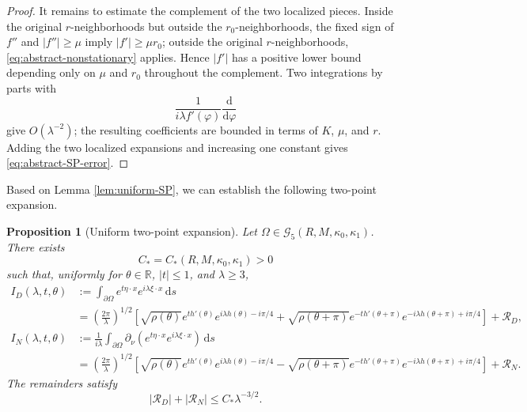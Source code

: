 \documentclass[12pt]{article}
\newcommand{\R}{\mathbb{R}}
\numberwithin{equation}{section}
\newtheorem{proposition}[theorem]{Proposition}
\numberwithin{equation}{section}
\newcommand{\pd}{\partial}
\newcommand{\dd}{\,\mathrm{d}}
\newcommand{\cG}{\mathcal{G}}
\newcommand{\cR}{\mathcal{R}}
\begin{document}
\begin{proof}
It remains to estimate the complement of the two localized pieces. Inside
the original $r$-neighborhoods but outside the $r_0$-neighborhoods, the fixed
sign of $f''$ and $\left|f''\right|\ge\mu$ imply $\left|f'\right|\ge\mu r_0$; outside the original
$r$-neighborhoods, \eqref{eq:abstract-nonstationary} applies. Hence $\left|f'\right|$
has a positive lower bound depending only on $\mu$ and $r_0$ throughout the
complement. Two integrations by parts with
\[
 \frac{1}{i\lambda f'(\varphi)}\frac{\mathrm{d}}{\mathrm{d}\varphi}
\]
give $O\left(\lambda^{-2}\right)$; the resulting coefficients are bounded in terms of
$K$, $\mu$, and $r$. Adding the two localized expansions and increasing one
constant gives
\eqref{eq:abstract-SP-error}.
\end{proof}

Based on Lemma \ref{lem:uniform-SP}, we can establish the following two-point expansion.
\begin{proposition}[Uniform two-point expansion]\label{prop:stationary}
Let $\Omega\in\cG_5\left(R,M,\kappa_0,\kappa_1\right)$. There exists
\[
C_*=C_*\left(R,M,\kappa_0,\kappa_1\right)>0
\]
such that, uniformly for $\theta\in\R$, $|t|\le1$, and $\lambda\ge3$,
\begin{align}
I_D(\lambda,t,\theta)
&:=\int_{\pd\Omega}
e^{t\eta\cdot x}e^{i\lambda\xi\cdot x}\dd s\nonumber\\
&=\left(\frac{2\pi}{\lambda}\right)^{1/2}
\left[
\sqrt{\rho(\theta)}e^{t h'(\theta)}
e^{i\lambda h(\theta)-i\pi/4}
+\sqrt{\rho(\theta+\pi)}e^{-t h'(\theta+\pi)}
e^{-i\lambda h(\theta+\pi)+i\pi/4}
\right]
+\cR_D,\label{eq:SP-D}\\
I_N(\lambda,t,\theta)
&:=\frac1{i\lambda}
\int_{\pd\Omega}
\pd_\nu\!\left(
e^{t\eta\cdot x}e^{i\lambda\xi\cdot x}
\right)\dd s\nonumber\\
&=\left(\frac{2\pi}{\lambda}\right)^{1/2}
\left[
\sqrt{\rho(\theta)}e^{t h'(\theta)}
e^{i\lambda h(\theta)-i\pi/4}
-\sqrt{\rho(\theta+\pi)}e^{-t h'(\theta+\pi)}
e^{-i\lambda h(\theta+\pi)+i\pi/4}
\right]
+\cR_N.\label{eq:SP-N}
\end{align}
The remainders satisfy
\begin{equation}\label{eq:remainder}
\left|\cR_D\right|+\left|\cR_N\right|\le C_*\lambda^{-3/2}.
\end{equation}
\end{proposition}
\end{document}
